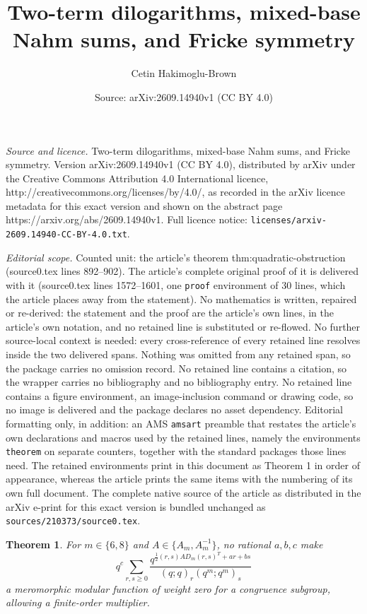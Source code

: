 \documentclass[10pt,a4paper]{amsart}
\title{Two-term dilogarithms, mixed-base Nahm sums, and Fricke symmetry}
\author{Cetin Hakimoglu-Brown}
\date{Source: arXiv:2609.14940v1 (CC BY 4.0)}
\newtheorem{theorem}{Theorem}
\begin{document}
\maketitle

\noindent\emph{Source and licence.} Two-term dilogarithms, mixed-base Nahm sums, and Fricke symmetry. Version arXiv:2609.14940v1 (CC BY 4.0), distributed by arXiv under the Creative Commons Attribution 4.0 International licence, http://creativecommons.org/licenses/by/4.0/, as recorded in the arXiv licence metadata for this exact version and shown on the abstract page https://arxiv.org/abs/2609.14940v1. Full licence notice: \texttt{licenses/arxiv-2609.14940-CC-BY-4.0.txt}.\par\smallskip

\noindent\textit{Editorial scope.} Counted unit: the article's theorem thm:quadratic-obstruction (source0.tex lines 892--902). The article's complete original proof of it is delivered with it (source0.tex lines 1572--1601, one \texttt{proof} environment of 30 lines, which the article places away from the statement). No mathematics is written, repaired or re-derived: the statement and the proof are the article's own lines, in the article's own notation, and no retained line is substituted or re-flowed.  No further source-local context is needed: every cross-reference of every retained line resolves inside the two delivered spans.  Nothing was omitted from any retained span, so the package carries no omission record.  No retained line contains a citation, so the wrapper carries no bibliography and no bibliography entry.  No retained line contains a figure environment, an image-inclusion command or drawing code, so no image is delivered and the package declares no asset dependency.  Editorial formatting only, in addition: an AMS \texttt{amsart} preamble that restates the article's own declarations and macros used by the retained lines, namely the environments \texttt{theorem} on separate counters, together with the standard packages those lines need.  The retained environments print in this document as Theorem 1 in order of appearance, whereas the article prints the same items with the numbering of its own full document.  The complete native source of the article as distributed in the arXiv e-print for this exact version is bundled unchanged as \texttt{sources/210373/source0.tex}.
\begin{theorem}\label{thm:quadratic-obstruction}
For $m\in\{6,8\}$ and $A\in\{A_m,A_m^{-1}\}$, no rational
$a,b,c$ make
\[
 q^c\sum_{r,s\geq0}
 \frac{q^{\frac12(r,s)AD_m(r,s)^T+ar+bs}}
 {(q;q)_r(q^m;q^m)_s}
\]
a meromorphic modular function of weight zero for a congruence
subgroup, allowing a finite-order multiplier.
\end{theorem}
\end{document}

